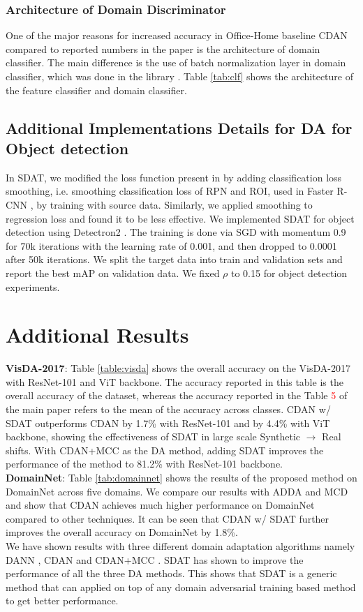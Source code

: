 \documentclass[table,dvipsnames]{article}
\theoremstyle{plain}
\theoremstyle{definition}
\theoremstyle{remark}
\begin{document}
\subsubsection{Architecture of Domain Discriminator}
One of the major reasons for increased accuracy in Office-Home baseline CDAN compared to reported numbers in the paper is the architecture of domain classifier. The main difference is the use of batch normalization layer in domain classifier, which was done in the library \citep{dalib}. Table \ref{tab:clf} shows the architecture of the feature classifier and domain classifier.


\subsection{Additional Implementations Details for DA for Object detection}
In SDAT, we modified the loss function present in \citet{chen2018domaindafaster} by adding classification loss smoothing, i.e. smoothing classification loss of RPN and ROI, used in {Faster R-CNN} \citep{ren2015faster}, by training with source data. Similarly, we applied smoothing to regression loss and found it to be less effective. We implemented SDAT for object detection using Detectron2 \citep{wu2019detectron2}. The training is done via SGD with momentum 0.9 for 70k iterations with the learning rate of 0.001, and then dropped to 0.0001 after 50k iterations. We split the target data into train and validation sets and report the best mAP on validation data. 
We fixed $\rho$ to 0.15 for object detection experiments. 


\section{Additional Results}\label{app:add_results}
\textbf{VisDA-2017}:
Table \ref{table:visda} shows the overall accuracy on the VisDA-2017 with ResNet-101 and ViT backbone. The accuracy reported in this table is the overall accuracy of the dataset, whereas the accuracy reported in the Table \textcolor{red}{5} of the main paper refers to the mean of the accuracy across classes. CDAN w/ SDAT outperforms CDAN by 1.7\% with ResNet-101 and by 4.4\% with ViT backbone, showing the effectiveness of SDAT in large scale Synthetic $\rightarrow$ Real shifts. With CDAN+MCC as the DA method, adding SDAT improves the performance of the method to 81.2\% with ResNet-101 backbone.\\
\textbf{DomainNet}:
Table \ref{tab:domainnet} shows the results of the proposed method on DomainNet across five domains. We compare our results with ADDA and MCD and show that CDAN achieves much higher performance on DomainNet compared to other techniques. It can be seen that CDAN w/ SDAT further improves the overall accuracy on DomainNet by 1.8\%. 
\\
We have shown results with three different domain adaptation algorithms namely DANN \citep{ganin2015unsupervised}, CDAN \citep{long2018conditional} and CDAN+MCC \citep{jin2020minimum}. SDAT has shown to improve the performance of all the three DA methods. This shows that SDAT is a generic method that can applied on top of any domain adversarial training based method to get better performance.
\end{document}
